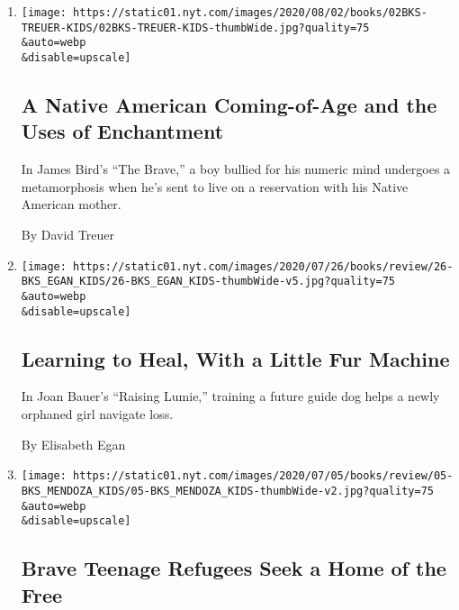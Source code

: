 \begin{enumerate}
\def\labelenumi{\arabic{enumi}.}
\item
  \href{/2020/07/31/books/review/the-brave-james-bird.html}{}

  \texttt{[image: https://static01.nyt.com/images/2020/08/02/books/02BKS-TREUER-KIDS/02BKS-TREUER-KIDS-thumbWide.jpg?quality=75\\\&auto=webp\\\&disable=upscale]}

  \hypertarget{a-native-american-coming-of-age-and-the-uses-of-enchantment}{%
  \subsection{A Native American Coming-of-Age and the Uses of
  Enchantment}\label{a-native-american-coming-of-age-and-the-uses-of-enchantment}}

  In James Bird's ``The Brave,'' a boy bullied for his numeric mind
  undergoes a metamorphosis when he's sent to live on a reservation with
  his Native American mother.

  By David Treuer
\item
  \href{/2020/07/18/books/review/joan-bauer-raising-lumie.html}{}

  \texttt{[image: https://static01.nyt.com/images/2020/07/26/books/review/26-BKS\_EGAN\_KIDS/26-BKS\_EGAN\_KIDS-thumbWide-v5.jpg?quality=75\\\&auto=webp\\\&disable=upscale]}

  \hypertarget{learning-to-heal-with-a-little-fur-machine}{%
  \subsection{Learning to Heal, With a Little Fur
  Machine}\label{learning-to-heal-with-a-little-fur-machine}}

  In Joan Bauer's ``Raising Lumie,'' training a future guide dog helps a
  newly orphaned girl navigate loss.

  By Elisabeth Egan
\item
  \href{/2020/06/27/books/review/we-are-not-from-here-jenny-torres-sanchez.html}{}

  \texttt{[image: https://static01.nyt.com/images/2020/07/05/books/review/05-BKS\_MENDOZA\_KIDS/05-BKS\_MENDOZA\_KIDS-thumbWide-v2.jpg?quality=75\\\&auto=webp\\\&disable=upscale]}

  \hypertarget{brave-teenage-refugees-seek-a-home-of-the-free}{%
  \subsection{Brave Teenage Refugees Seek a Home of the
  Free}\label{brave-teenage-refugees-seek-a-home-of-the-free}}


\end{enumerate}
